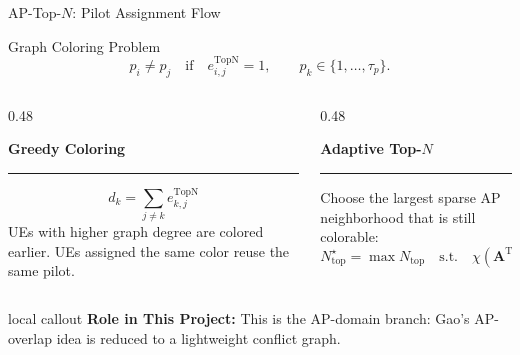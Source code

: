 \documentclass[aspectratio=169, 10pt]{beamer}
\newcommand{\methodTopN}{AP-Top-\(N\)}
\newcommand{\slideheading}[1]{%
    \par\vspace{0.08cm}%
    \settowidth{\dimen0}{\bfseries\large #1}%
    {\bfseries\large #1}%
    \par\vspace{0.015cm}%
    {\color{black}\rule{\dimen0}{0.7pt}}%
    \par\vspace{0.16cm}%
}
\newcommand{\slidecallout}[2]{%
    \vspace{0.08cm}%
    \begin{beamercolorbox}[wd=\linewidth,sep=0.55ex,leftskip=0.8ex,rightskip=0.8ex,rounded=true]{local callout}
        \small{\color{ku_crimson}\bfseries #1:} #2
    \end{beamercolorbox}%
}
\begin{document}
\begin{frame}{\methodTopN{}: Pilot Assignment Flow}
    \small
    \begin{block}{Graph Coloring Problem}
        \[
            p_i\neq p_j
            \quad
            \text{if}
            \quad
            e_{i,j}^{\mathrm{TopN}}=1,
            \qquad
            p_k\in\{1,\ldots,\tau_p\}.
        \]
    \end{block}

    \begin{columns}[T,onlytextwidth]
        \begin{column}{0.48\textwidth}
            \slideheading{Greedy Coloring}
            \[
                d_k=\sum_{j\neq k}e_{k,j}^{\mathrm{TopN}}
            \]
            UEs with higher graph degree are colored earlier. UEs assigned the same color reuse the same pilot.
        \end{column}
        \begin{column}{0.48\textwidth}
            \slideheading{Adaptive Top-\(N\)}
            Choose the largest sparse AP neighborhood that is still colorable:
            \[
                N_{\mathrm{top}}^\star
                =
                \max N_{\mathrm{top}}
                \quad
                \text{s.t.}
                \quad
                \chi(\mathbf{A}^{\mathrm{TopN}})\le \tau_p.
            \]
        \end{column}
    \end{columns}

    \slidecallout{Role in This Project}{This is the AP-domain branch: Gao's AP-overlap idea is reduced to a lightweight conflict graph.}
\end{frame}
\end{document}

